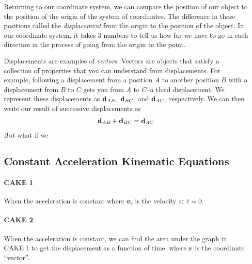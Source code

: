 Returning to our coordinate system, we can compare the position of our object to the position of the origin of the system of coordinates. The difference in these positions called the {\em displacement} from the origin to the position of the object. In our coordinate system, it takes 3 numbers to tell us how far we have to go in each direction in the process of going from the origin to the point. 

Displacements are examples of {\em vectors}. Vectors are objects that satisfy a collection of properties that you can understand from displacements. For example, following a displacement from a position $A$ to another position $B$ with a displacement from $B$ to $C$ gets you from $A$ to $C$--a third displacement. We represent these displacements as ${\bf d}_{AB}$, ${\bf d}_{BC}$, and ${\bf d}_{AC}$, respectively. We can then write our result of successive displacements as 
$$
{\bf d}_{AB}+{\bf d}_{BC}={\bf d}_{AC}
$$
But what if we 


\subsection{Constant Acceleration Kinematic Equations}

\paragraph{CAKE 1}
When the acceleration is constant 
where $𝒗₀$ is the velocity at $t=0$.

\paragraph{CAKE 2}
When the acceleration is constant, we can find the area under the graph in CAKE 1 to get the displacement as a function of time.
where $\bf r$ is the coordinate “vector”. 

